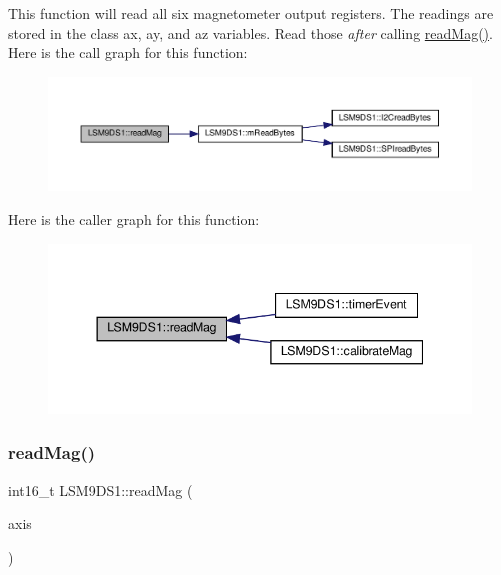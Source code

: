 This function will read all six magnetometer output registers. The readings are stored in the class\textquotesingle{} ax, ay, and az variables. Read those {\itshape after} calling \hyperlink{classLSM9DS1_ae127cf75aa5f3c5421e49363795dcd38}{read\+Mag()}. Here is the call graph for this function\+:\nopagebreak
\begin{figure}[H]
\begin{center}
\leavevmode
\includegraphics[width=350pt]{classLSM9DS1_ae127cf75aa5f3c5421e49363795dcd38_cgraph}
\end{center}
\end{figure}
Here is the caller graph for this function\+:\nopagebreak
\begin{figure}[H]
\begin{center}
\leavevmode
\includegraphics[width=344pt]{classLSM9DS1_ae127cf75aa5f3c5421e49363795dcd38_icgraph}
\end{center}
\end{figure}
\mbox{\label{classLSM9DS1_a615fd3ab32a9af833ef9899663100330}} 
\subsubsection{\texorpdfstring{read\+Mag()}{readMag()}\hspace{0.1cm}{\footnotesize\ttfamily [2/2]}}
{\footnotesize\ttfamily int16\+\_\+t L\+S\+M9\+D\+S1\+::read\+Mag (\begin{DoxyParamCaption}\item[{lsm9ds1\+\_\+axis}]{axis }\end{DoxyParamCaption})}



